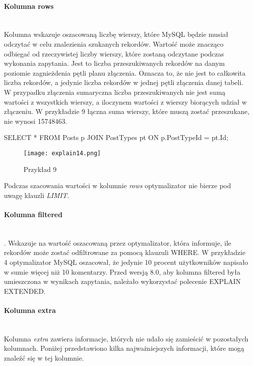 \paragraph{Kolumna rows}\leavevmode\\
Kolumna wskazuje oszacowaną liczbę wierszy, które MySQL będzie musiał odczytać w celu znalezienia szukanych rekordów. Wartość może znacząco odbiegać od rzeczywistej liczby wierszy, które zostaną odczytane podczas wykonania zapytania. Jest to liczba przeszukiwanych rekordów na danym poziomie zagnieżdenia pętli planu złączenia. Oznacza to, że nie jest to całkowita liczba rekordów, a jedynie liczba rekordów w jednej pętli złączenia danej tabeli. W przypadku złączenia sumaryczna liczba przeszukiwanych nie jest sumą wartości z wszystkich wierszy, a iloczynem wartości z wierszy biorących udział w złączeniu. W przykładzie 9 łączna suma wierszy, które muszą zostać przeszukane, nie wynosi 15748463.
\begin{spverbatim}
	SELECT * FROM Posts p JOIN PostTypes pt ON p.PostTypeId = pt.Id;
\end{spverbatim}
\begin{figure}[H]
	\texttt{[image: explain14.png]} 
	\caption{Przykład 9}
\end{figure}
Podczas szacowania wartości w kolumnie \textit{rows} optymalizator nie bierze pod uwagę klauzli \textit{LIMIT}.

\paragraph{Kolumna filtered}\leavevmode\\. Wskazuje na wartość oszacowaną przez optymalizator, która informuje, ile rekordów może zostać odfiltrowane za pomocą klauzuli WHERE. W przykładzie 4 optymalizator MySQL oszacował, że jedynie 10 procent użytkowników napisało w sumie więcej niż 10 komentarzy. Przed wersją 8.0, aby kolumna filtered była umieszczona w wynikach zapytania, należało wykorzystać polecenie EXPLAIN EXTENDED.

\paragraph{Kolumna extra}\leavevmode\\
Kolumna \textit{extra} zawiera informacje, których nie udało się zamieścić w pozostałych kolumnach. Poniżej przedstawiono kilka najważniejszych informacji, które mogą znaleźć się w tej kolumnie.

